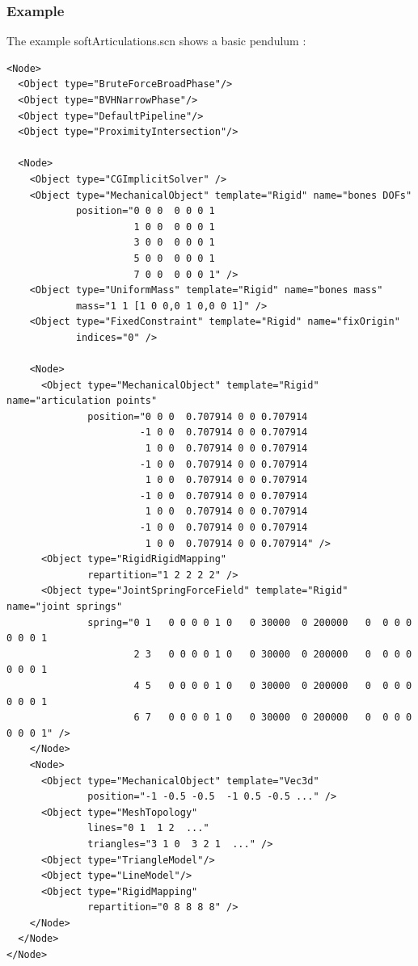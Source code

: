 \subsubsection {Example}

The example softArticulations.scn shows a basic pendulum :

\begin{verbatim}
<Node>
  <Object type="BruteForceBroadPhase"/>
  <Object type="BVHNarrowPhase"/>
  <Object type="DefaultPipeline"/>
  <Object type="ProximityIntersection"/>

  <Node>
    <Object type="CGImplicitSolver"	/>
    <Object type="MechanicalObject" template="Rigid" name="bones DOFs"
            position="0 0 0  0 0 0 1 
                      1 0 0  0 0 0 1 
                      3 0 0  0 0 0 1 
                      5 0 0  0 0 0 1 
                      7 0 0  0 0 0 1" />
    <Object type="UniformMass" template="Rigid" name="bones mass"
            mass="1 1 [1 0 0,0 1 0,0 0 1]" />
    <Object type="FixedConstraint" template="Rigid" name="fixOrigin"
            indices="0" />
		
    <Node>
      <Object type="MechanicalObject" template="Rigid" name="articulation points"
              position="0 0 0  0.707914 0 0 0.707914 
                       -1 0 0  0.707914 0 0 0.707914 
                        1 0 0  0.707914 0 0 0.707914 
                       -1 0 0  0.707914 0 0 0.707914 
                        1 0 0  0.707914 0 0 0.707914 
                       -1 0 0  0.707914 0 0 0.707914 
                        1 0 0  0.707914 0 0 0.707914 
                       -1 0 0  0.707914 0 0 0.707914 
                        1 0 0  0.707914 0 0 0.707914" />
      <Object type="RigidRigidMapping"
              repartition="1 2 2 2 2" />
      <Object type="JointSpringForceField" template="Rigid" name="joint springs"
              spring="0 1   0 0 0 0 1 0   0 30000  0 200000   0  0 0 0  0 0 0 1 
                      2 3   0 0 0 0 1 0   0 30000  0 200000   0  0 0 0  0 0 0 1
                      4 5   0 0 0 0 1 0   0 30000  0 200000   0  0 0 0  0 0 0 1
                      6 7   0 0 0 0 1 0   0 30000  0 200000   0  0 0 0  0 0 0 1" />
    </Node>
    <Node>
      <Object type="MechanicalObject" template="Vec3d"
              position="-1 -0.5 -0.5  -1 0.5 -0.5 ..." />
      <Object type="MeshTopology"
              lines="0 1  1 2  ..."
              triangles="3 1 0  3 2 1  ..." />
      <Object type="TriangleModel"/>
      <Object type="LineModel"/>
      <Object type="RigidMapping"
              repartition="0 8 8 8 8" />
    </Node>
  </Node>
</Node>

\end{verbatim}

